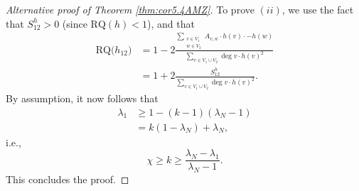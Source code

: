 \documentclass{article}
\newcommand{\RQ}{\textrm{RQ}}
\theoremstyle{plain}
\theoremstyle{definition}
\theoremstyle{remark}
\begin{document}
\begin{proof}[Alternative proof of Theorem \ref{thm:cor5.4AMZ}]
    To prove $(ii)$, we use the fact that $S_{12}^h>0$ (since $\RQ(h)<1$), and that
    \begin{align*}
        \RQ\bigl(h_{12}\bigr) &= 1 -2\frac{\sum_{\substack{v\in V_1\\ w\in V_2}}A_{v,w}\cdot h(v)\cdot -h(w)}{\sum_{v\in V_1\cup V_2}\deg v\cdot h(v)^2}\\
        &= 1+2\frac{S_{12}^h}{\sum_{v\in V_1\cup V_2}\deg v\cdot h(v)^2}.
    \end{align*}
    By assumption, it now follows that
    \begin{equation*}
    \begin{aligned}
        \lambda_1&\geq 1-( k-1)(\lambda_N-1) \\
        &=  k(1-\lambda_N)+\lambda_N,
    \end{aligned}
    \end{equation*}
    i.e.,
    \begin{equation}\label{eq:inequality2.2}
        \chi \geq k \geq \frac{\lambda_N-\lambda_1}{\lambda_N-1}.
    \end{equation}
    This concludes the proof.
\end{proof}
\end{document}
